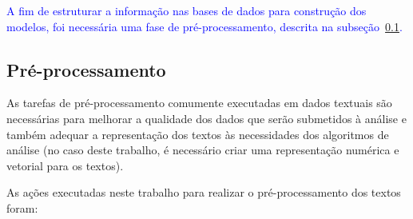 \documentclass[
    12pt,                %
    oneside,            %
    a4paper,            %
    english,            %
    brazil                %
    ]{abntex2ppgsi}
\begin{document}
\textcolor{blue}{A fim de estruturar a informação nas bases de dados para construção dos modelos, foi necessária uma fase de pré-processamento, descrita na subseção~\ref{subsec:preproc}.}

\subsection{Pré-processamento}
\label{subsec:preproc}

As tarefas de pré-processamento comumente executadas em dados textuais são necessárias para melhorar a qualidade dos dados que serão submetidos à análise e também adequar a representação dos textos às necessidades dos algoritmos de análise (no caso deste trabalho, é necessário criar uma representação numérica e vetorial para os textos).


As ações executadas neste trabalho para realizar o pré-processamento dos textos foram:

\end{document}
